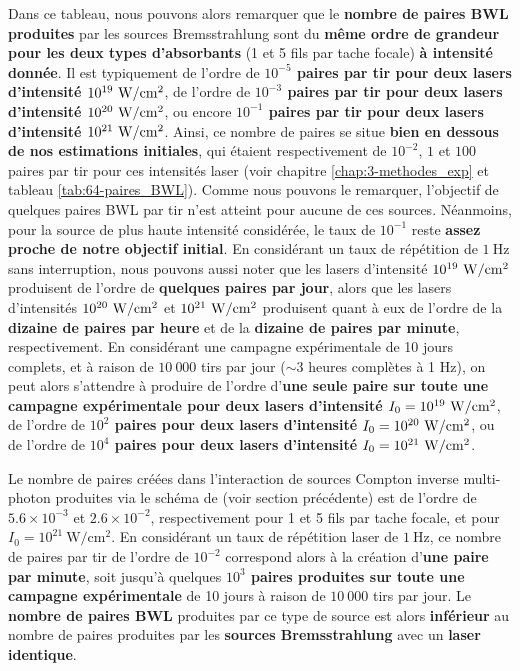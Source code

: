 \begin{refsection}
Dans ce tableau, nous pouvons alors remarquer que le \textbf{nombre de paires BWL produites} par les sources Bremsstrahlung sont du \textbf{même ordre de grandeur pour les deux types d'absorbants} (1 et 5 fils par tache focale) \textbf{à intensité donnée}. Il est typiquement de l'ordre de \textbf{$10^{-5}$ paires par tir pour deux lasers d'intensité $10^{19} ~ \rm W/cm^2$}, de l'ordre de \textbf{$10^{-3}$ paires par tir pour deux lasers d'intensité $10^{20} ~ \rm W/cm^2$}, ou encore \textbf{$10^{-1}$ paires par tir pour deux lasers d'intensité $10^{21} ~ \rm W/cm^2$}. Ainsi, ce nombre de paires se situe \textbf{bien en dessous de nos estimations initiales}, qui étaient respectivement de $10^{-2}$, $1$ et $100$ paires par tir pour ces intensités laser (voir chapitre \ref{chap:3-methodes_exp} et tableau \ref{tab:64-paires_BWL}). Comme nous pouvons le remarquer, l'objectif de quelques paires BWL par tir n'est atteint pour aucune de ces sources. Néanmoins, pour la source de plus haute intensité considérée, le taux de $10^{-1}$ reste \textbf{assez proche de notre objectif initial}. En considérant un taux de répétition de $1 ~ \si{\Hz}$ sans interruption, nous pouvons aussi noter que les lasers d'intensité $10^{19} ~ \rm W/cm^2$ produisent de l'ordre de \textbf{quelques paires par jour}, alors que les lasers d'intensités $10^{20} ~ \rm W/cm^2$ et $10^{21} ~ \rm W/cm^2$ produisent quant à eux de l'ordre de la \textbf{dizaine de paires par heure} et de la \textbf{dizaine de paires par minute}, respectivement. En considérant une campagne expérimentale de 10 jours complets, et à raison de $10 ~ 000$ tirs par jour ($\sim 3$ heures complètes à 1 Hz), on peut alors s'attendre à produire de l'ordre d'\textbf{une seule paire sur toute une campagne expérimentale pour deux lasers d'intensité $I_0=10^{19}  ~ \rm W/cm^2$}, de l'ordre de \textbf{$10^2$ paires pour deux lasers d'intensité $I_0=10^{20}  ~ \rm W/cm^2$}, ou de l'ordre de \textbf{$10^4$ paires pour deux lasers d'intensité $I_0=10^{21} ~ \rm W/cm^2$}. 


Le nombre de paires créées dans l'interaction de sources Compton inverse multi-photon produites via le schéma de \cite{huang_2018} (voir section précédente) est de l'ordre de $5.6 \times 10^{-3}$ et $2.6 \times 10^{-2}$, respectivement pour 1 et 5 fils par tache focale, et pour $I_0 = 10^{21} ~ \si{\W\per\cm^2}$. 
En considérant un taux de répétition laser de $1 ~ \si{\Hz}$, ce nombre de paires par tir de l'ordre de $10^{-2}$ correspond alors à la création d'\textbf{une paire par minute}, soit jusqu'à quelques \textbf{$10^3$ paires produites sur toute une campagne expérimentale} de 10 jours à raison de $10 ~ 000$ tirs par jour. Le \textbf{nombre de paires BWL} produites par ce type de source est alors \textbf{inférieur} au nombre de paires produites par les \textbf{sources Bremsstrahlung} avec un \textbf{laser identique}. 


\end{refsection}
